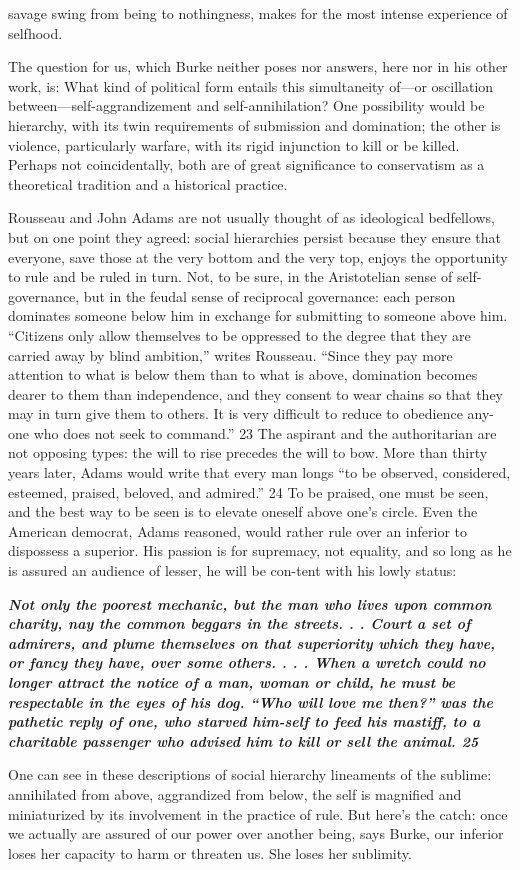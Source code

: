savage swing from being to nothingness, makes for the most intense experience of selfhood.{\par} The question for us, which Burke neither poses nor answers, here nor in his other work, is: What kind of political form entails this simultaneity of—or oscillation between—self-aggrandizement and self-annihilation? One possibility would be hierarchy, with its twin requirements of submission and domination; the other is violence, particularly warfare, with its rigid injunction to kill or be killed. Perhaps not coincidentally, both are of great significance to conservatism as a theoretical tradition and a historical practice.{\par} Rousseau and John Adams are not usually thought of as ideological bedfellows, but on one point they agreed: social hierarchies persist because they ensure that everyone, save those at the very bottom and the very top, enjoys the opportunity to rule and be ruled in turn. Not, to be sure, in the Aristotelian sense of self-governance, but in the feudal sense of reciprocal governance: each person dominates someone below him in exchange for submitting to someone above him. “Citizens only allow themselves to be oppressed to the degree that they are carried away by blind ambition,” writes Rousseau. “Since they pay more attention to what is below them than to what is above, domination becomes dearer to them than independence, and they consent to wear chains so that they may in turn give them to others. It is very difficult to reduce to obedience any-one who does not seek to command.” {\color{blue} 23 } The aspirant and the authoritarian are not opposing types: the will to rise precedes the will to bow. More than thirty years later, Adams would write that every man longs “to be observed, considered, esteemed, praised, beloved, and admired.” {\color{blue} 24 } To be praised, one must be seen, and the best way to be seen is to elevate oneself above one’s circle. Even the American democrat, Adams reasoned, would rather rule over an inferior to dispossess a superior. His passion is for supremacy, not equality, and so long as he is assured an audience of lesser, he will be con-tent with his lowly status:{\par} {\textbf{\textit{Not only the poorest mechanic, but the man who lives upon common charity, nay the common beggars in the streets. . . Court a set of admirers, and plume themselves on that superiority which they have, or fancy they have, over some others. . . . When a wretch could no longer attract the notice of a man, woman or child, he must be respectable in the eyes of his dog. “Who will love me then?” was the pathetic reply of one, who starved him-self to feed his mastiff, to a charitable passenger who advised him to kill or sell the animal. {\color{blue} 25 } } } }{\par} One can see in these descriptions of social hierarchy lineaments of the sublime: annihilated from above, aggrandized from below, the self is magnified and miniaturized by its involvement in the practice of rule. But here’s the catch: once we actually are assured of our power over another being, says Burke, our inferior loses her capacity to harm or threaten us. She loses her sublimity. 